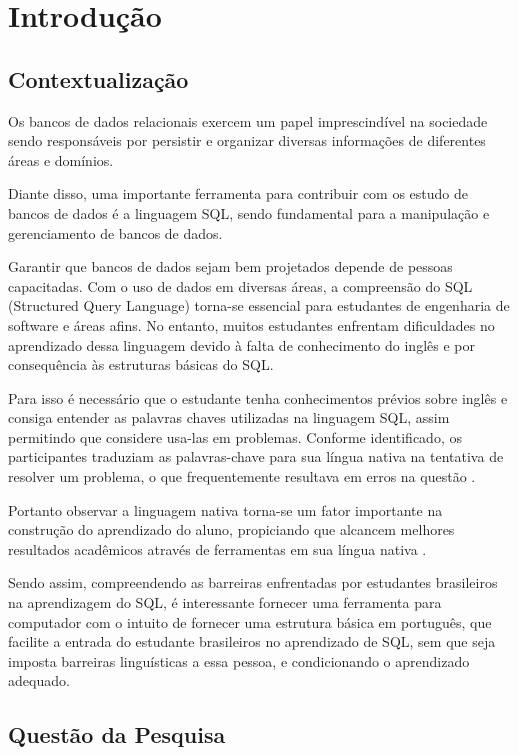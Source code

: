
\chapter[Introdução]{Introdução}
\label{sec:Introducao}

\section{Contextualização}

Os bancos de dados relacionais exercem um papel imprescindível na sociedade sendo responsáveis por persistir e organizar diversas informações de diferentes áreas e domínios.

Diante disso, uma importante ferramenta para contribuir com os estudo de bancos de dados é a linguagem SQL, sendo fundamental para a manipulação e gerenciamento de bancos de dados.

Garantir que bancos de dados sejam bem projetados depende de pessoas capacitadas. Com o uso de dados em diversas áreas, a compreensão do SQL (Structured Query Language) torna-se essencial para estudantes de engenharia de software e áreas afins. No entanto, muitos estudantes enfrentam dificuldades no aprendizado dessa linguagem devido à falta de conhecimento do inglês e por consequência às estruturas básicas do SQL.

Para isso é necessário que o estudante tenha conhecimentos prévios sobre inglês e consiga entender as palavras chaves utilizadas na linguagem SQL, assim permitindo que considere usa-las em problemas. Conforme identificado, os participantes traduziam as palavras-chave para sua língua nativa na tentativa de resolver um problema, o que frequentemente resultava em erros na questão \cite{Miedema2021}.

Portanto observar a linguagem nativa torna-se um fator importante na construção do aprendizado do aluno, propiciando que alcancem melhores resultados acadêmicos através de ferramentas em sua língua nativa \cite{Silva2020}.

Sendo assim, compreendendo as barreiras enfrentadas por estudantes brasileiros na aprendizagem do SQL, é interessante fornecer uma ferramenta para computador com o intuito de fornecer uma estrutura básica em português, que facilite a entrada do estudante brasileiros no aprendizado de SQL, sem que seja imposta barreiras linguísticas a essa pessoa, e condicionando o aprendizado adequado.


\section{Questão da Pesquisa}

